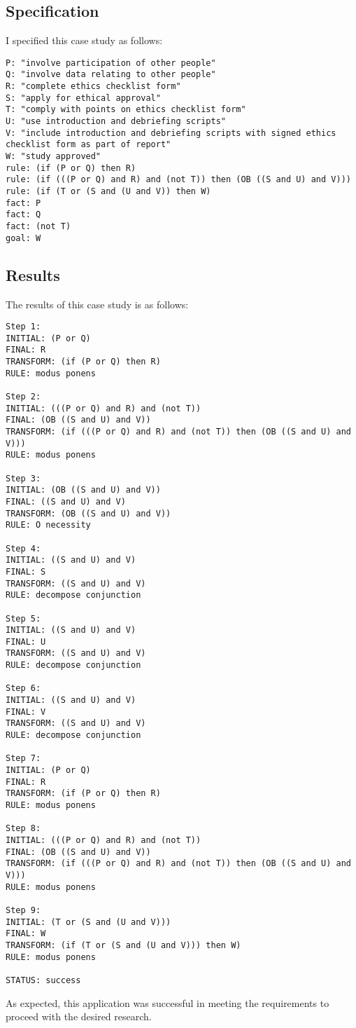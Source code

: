 \documentclass{l4proj}
\begin{document}
\subsection{Specification}
I specified this case study as follows: 
\begin{verbatim}
P: "involve participation of other people"
Q: "involve data relating to other people"
R: "complete ethics checklist form"
S: "apply for ethical approval"
T: "comply with points on ethics checklist form"
U: "use introduction and debriefing scripts"
V: "include introduction and debriefing scripts with signed ethics checklist form as part of report"
W: "study approved"
rule: (if (P or Q) then R)
rule: (if (((P or Q) and R) and (not T)) then (OB ((S and U) and V)))
rule: (if (T or (S and (U and V)) then W)
fact: P
fact: Q
fact: (not T)
goal: W
\end{verbatim}

\subsection{Results}
The results of this case study is as follows: 
\begin{verbatim}
Step 1: 
INITIAL: (P or Q)
FINAL: R
TRANSFORM: (if (P or Q) then R)
RULE: modus ponens

Step 2: 
INITIAL: (((P or Q) and R) and (not T))
FINAL: (OB ((S and U) and V))
TRANSFORM: (if (((P or Q) and R) and (not T)) then (OB ((S and U) and V)))
RULE: modus ponens

Step 3: 
INITIAL: (OB ((S and U) and V))
FINAL: ((S and U) and V)
TRANSFORM: (OB ((S and U) and V))
RULE: O necessity

Step 4: 
INITIAL: ((S and U) and V)
FINAL: S
TRANSFORM: ((S and U) and V)
RULE: decompose conjunction

Step 5: 
INITIAL: ((S and U) and V)
FINAL: U
TRANSFORM: ((S and U) and V)
RULE: decompose conjunction

Step 6: 
INITIAL: ((S and U) and V)
FINAL: V
TRANSFORM: ((S and U) and V)
RULE: decompose conjunction

Step 7: 
INITIAL: (P or Q)
FINAL: R
TRANSFORM: (if (P or Q) then R)
RULE: modus ponens

Step 8: 
INITIAL: (((P or Q) and R) and (not T))
FINAL: (OB ((S and U) and V))
TRANSFORM: (if (((P or Q) and R) and (not T)) then (OB ((S and U) and V)))
RULE: modus ponens

Step 9: 
INITIAL: (T or (S and (U and V)))
FINAL: W
TRANSFORM: (if (T or (S and (U and V))) then W)
RULE: modus ponens

STATUS: success
\end{verbatim}
As expected, this application was successful in meeting the requirements to proceed with the desired research. 
\end{document}

